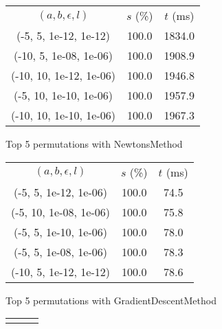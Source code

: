 \begin{figure}[H]
\label{fig:param_comp_NegativeEntropy_FibonacciSearch}
\begin{subfigure}[ht]{.5\textwidth}
\begin{tabular}{|c|c|c|}
\hline
\rowcolor{gray!25}
\multicolumn{3}{|c|}{NewtonsMethod} \\
\hline
\rowcolor{gray!25}
$(a,b,\epsilon,l)$ & $s$ (\%) & $t$ (ms) \\
\hline
(-5, 5, 1e-12, 1e-12) & 100.0 & 1834.0 \\
(-10, 5, 1e-08, 1e-06) & 100.0 & 1908.9 \\
(-10, 10, 1e-12, 1e-06) & 100.0 & 1946.8 \\
(-5, 10, 1e-10, 1e-06) & 100.0 & 1957.9 \\
(-10, 10, 1e-10, 1e-06) & 100.0 & 1967.3 \\
\hline
\end{tabular}
\caption{Top 5 permutations with NewtonsMethod}
\label{subfig:param_comp_NegativeEntropy_NewtonsMethod_FibonacciSearch}
\end{subfigure}
\hfill
\begin{subfigure}[ht]{.5\textwidth}
\begin{tabular}{|c|c|c|}
\hline
\rowcolor{gray!25}
\multicolumn{3}{|c|}{GradientDescentMethod} \\
\hline
\rowcolor{gray!25}
$(a,b,\epsilon,l)$ & $s$ (\%) & $t$ (ms) \\
\hline
(-5, 5, 1e-12, 1e-06) & 100.0 & 74.5 \\
(-5, 10, 1e-08, 1e-06) & 100.0 & 75.8 \\
(-5, 5, 1e-10, 1e-06) & 100.0 & 78.0 \\
(-5, 5, 1e-08, 1e-06) & 100.0 & 78.3 \\
(-10, 5, 1e-12, 1e-12) & 100.0 & 78.6 \\
\hline
\end{tabular}
\caption{Top 5 permutations with GradientDescentMethod}
\label{subfig:param_comp_NegativeEntropy_GradientDescentMethod_FibonacciSearch}
\end{subfigure}
\hfill
\begin{subfigure}[ht]{.5\textwidth}
\begin{tabular}{|c|c|c|}
\hline
\rowcolor{gray!25}
\multicolumn{3}{|c|}{ConjugateGradientMethod} \\

\end{tabular}
\end{subfigure}
\end{figure}
